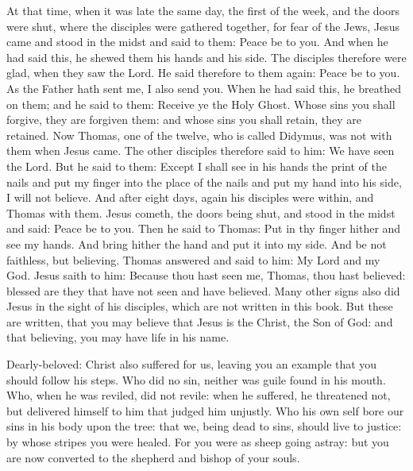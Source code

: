 \begin{multicols}{2}
At that time, when it was late the same day, the first of the week, and the doors were
shut, where the disciples were gathered together, for fear of the Jews, Jesus
came and stood in the midst and said to them: Peace be to you.   And when he had said this, he shewed them
his hands and his side.  The disciples therefore were glad, when they saw the
Lord.  He said therefore to them again: Peace be to you. As the Father hath
sent me, I also send you.  When he had said this, he breathed on them; and he
said to them: Receive ye the Holy Ghost.  Whose sins you shall forgive, they
are forgiven them: and whose sins you shall retain, they are retained.
 Now Thomas, one of the twelve, who is
called Didymus, was not with them when Jesus came.  The other disciples
therefore said to him: We have seen the Lord.  But he said to them: Except I
shall see in his hands the print of the nails and put my finger into the place
of the nails and put my hand into his side, I will not believe.  And after
eight days, again his disciples were within, and Thomas with them. Jesus
cometh, the doors being shut, and stood in the midst and said: Peace be to you.
Then he said to Thomas: Put in thy finger hither and see my hands. And bring
hither the hand and put it into my side.  And be not faithless, but believing.
Thomas answered and said to him: My Lord and my God.  Jesus saith to him:
Because thou hast seen me, Thomas, thou hast believed: blessed are they that
have not seen and have believed.  Many other signs also did Jesus in the sight
of his disciples, which are not written in this book.  But these are written,
that you may believe that Jesus is the Christ, the Son of God: and that
believing, you may have life in his name.

\bigskip




Dearly-beloved: %
Christ also suffered for us, leaving you
an example that you should follow his steps.  Who did no sin, neither was guile
found in his mouth.  Who, when he was reviled, did not revile: when he
suffered, he threatened not, but delivered himself to him that judged him
unjustly.  Who his own self bore our sins in his body upon the tree: that we,
being dead to sins, should live to justice: by whose stripes you were healed.
For you were as sheep going astray: but you are now converted to the shepherd
and bishop of your souls.



\end{multicols}
